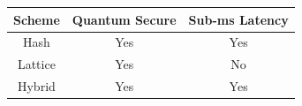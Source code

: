 \begin{tabular}{ccc}
\hline
Scheme & Quantum Secure & Sub-ms Latency \\
\hline
Hash & Yes & Yes \\
Lattice & Yes & No \\
Hybrid & Yes & Yes \\
\hline
\end{tabular}
